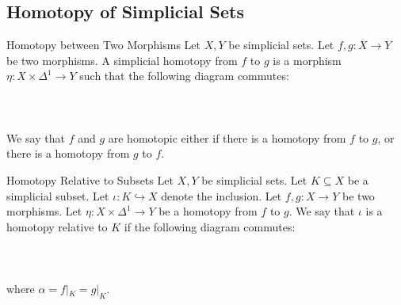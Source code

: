 \documentclass[a4paper]{article}
\begin{document}
\subsection{Homotopy of Simplicial Sets}
\begin{defn}{Homotopy between Two Morphisms}{} Let $X,Y$ be simplicial sets. Let $f,g:X\to Y$ be two morphisms. A simplicial homotopy from $f$ to $g$ is a morphism $\eta:X\times\Delta^1\to Y$ such that the following diagram commutes: \\~\\
\\~\\
We say that $f$ and $g$ are homotopic either if there is a homotopy from $f$ to $g$, or there is a homotopy from $g$ to $f$. 
\end{defn}

\begin{defn}{Homotopy Relative to Subsets}{} Let $X,Y$ be simplicial sets. Let $K\subseteq X$ be a simplicial subset. Let $\iota:K\hookrightarrow X$ denote the inclusion. Let $f,g:X\to Y$ be two morphisms. Let $\eta:X\times\Delta^1\to Y$ be a homotopy from $f$ to $g$. We say that $\iota$ is a homotopy relative to $K$ if the following diagram commutes: \\~\\
\\~\\
where $\alpha=f|_K=g|_K$. 
\end{defn}
\end{document}

